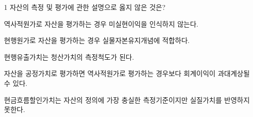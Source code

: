 \begin{question}{1}
자산의 측정 및 평가에 관한 설명으로 옳지 않은 것은?
\begin{choices}
  \item 역사적원가로 자산을 평가하는 경우 미실현이익을 인식하지 않는다.
  \item 현행원가로 자산을 평가하는 경우 실물자본유지개념에 적합하다.
  \item 현행유출가치는 청산가치의 측정척도가 된다.
  \item 자산을 공정가치로 평가하면 역사적원가로 평가하는 경우보다 회계이익이 과대계상될 수 있다.
  \item 현금흐름할인가치는 자산의 정의에 가장 충실한 측정기준이지만 실질가치를 반영하지 못한다.
\end{choices}
\end{question}
